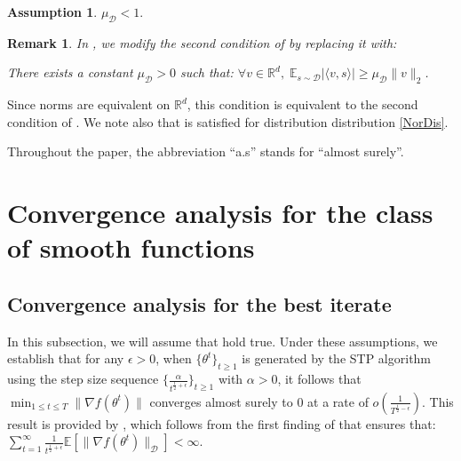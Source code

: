 \documentclass{article} %
\newtheorem{Remark}{Remark}
\newtheorem{assumption}{Assumption}
\begin{document}
\begin{assumption}\label{Ass7}
  $\mu_\mathcal{D} < 1.$  
\end{assumption}

\begin{Remark}\label{Rem1}
    In , we modify the second condition of  by replacing it with:

There exists a constant $\mu_\mathcal{D}>0$ such that: $\forall v \in \mathbb{R}^d,\;  \mathbb{E}_{s \sim \mathcal{D} } | \langle v,s \rangle | \ge \mu_{\mathcal{D}} \lVert v\rVert_2 $.
\end{Remark} 
Since norms are equivalent on $\mathbb{R}^d$, this condition is equivalent to the second condition of . 
We note also that  is satisfied  for  distribution distribution \ref{NorDis}.

Throughout the paper, the abbreviation ``a.s'' stands for ``almost surely''.


\section{Convergence analysis for the class of smooth functions}
\subsection{Convergence analysis for the best iterate}
In this subsection, we will assume that   hold true. 
Under these assumptions, we establish
that for any $\epsilon > 0$, when $\{\theta^t\}_{t \ge 1}$ is generated by the STP algorithm using the step size sequence $\{\frac{\alpha}{t^{\frac{1}{2}+\epsilon}} \}_{t \ge 1}$ with $\alpha>0$, it follows that $\min_{1 \le t \le T} \lVert \nabla f(\theta^t) \rVert$ converges almost surely to $0$ at a rate of $o(\frac{1}{T^{\frac{1}{2}-\epsilon }} )$. This result is provided by , which follows from the first finding of  that ensures that: $\sum_{t=1}^{\infty} \frac{1}{t^{\frac{1}{2}+\epsilon}} \mathbb{E}\left[ \lVert \nabla f(\theta^t) \rVert_{\mathcal{D}}\right] <\infty.$
\end{document}
